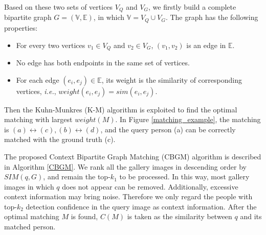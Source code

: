 \documentclass[letterpaper]{article} \usepackage{aaai21}  \usepackage{times}  \usepackage{helvet} \usepackage{courier}  \usepackage[hyphens]{url}  \usepackage{graphicx} \urlstyle{rm} \def\UrlFont{\rm}  \usepackage{natbib}  \usepackage{caption} \usepackage{multirow}
\begin{document}
Based on these two sets of vertices $V_Q$ and $V_G$, we firstly build a complete bipartite graph $G=(\mathbb{V},\mathbb{E})$, in which $\mathbb{V}=V_Q\cup V_G$. The graph has the following properties:
\begin{itemize}
    \item For every two vertices $v_1\in V_Q$ and $v_2\in V_G$, $(v_1,v_2)$ is an edge in $\mathbb{E}$.
    \item No edge has both endpoints in the same set of vertices.
    \item For each edge $(e_i,e_j)\in \mathbb{E}$, its weight is the similarity of corresponding vertices, \textit{i.e.}, $weight(e_i,e_j)=sim(e_i,e_j)$.
\end{itemize}

Then the Kuhn-Munkres (K-M) algorithm \cite{km-k,km-m} is exploited to find the optimal matching with largest $weight(M)$. In Figure \ref{matching_example}, the matching is $(a)\leftrightarrow(c), (b)\leftrightarrow(d)$, and the query person (a) can be correctly matched with the ground truth (c).

The proposed Context Bipartite Graph Matching (CBGM) algorithm is described in Algorithm \ref{CBGM}. We rank all the gallery images in descending order by $SIM(q, G)$, and remain the top-$k_1$ to be processed. In this way, most gallery images in which $q$ does not appear can be removed. Additionally, excessive context information may bring noise. Therefore we only regard the people with top-$k_2$ detection confidence in the query image as context information. After the optimal matching $M$ is found, $C(M)$ is taken as the similarity between $q$ and its matched person.
\end{document}
